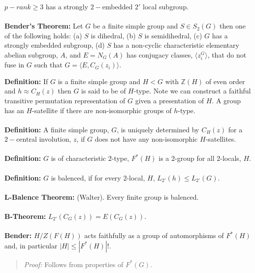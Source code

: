 $p-rank \ge 3$ has a strongly $2-$embedded $2'$ local subgroup.\\
\\
{\bf Bender's Theorem:} 
Let $G$ be a finite simple group and $S \in S_2(G)$ then one of the following holds:
(a) $S$ is dihedral, (b) $S$ is semidihedral, (c) $G$ has a strongly embedded subgroup,
(d) $S$ has a non-cyclic characteristic elementary abelian subgroup, $A$, and
$E=N_G(A)$ has conjugacy classes, $ \langle z_i^G \rangle $, that do not fuse in $G$ such that
$G= \langle E, C_G(z_i ) \rangle $.
\begin{quote}
\end{quote}
{\bf Definition:}
If $G$ is a finite simple group and
$H<G$ with ${\mathbb Z}(H)$ of even order and $h \approx C_H(z)$ then $G$ is said
to be of $H$-type.  Note we can construct a faithful transitive permutation representation
of $G$ given a presentation of $H$.  A group has an $H$-satellite if there are non-isomorphic
groups of $h$-type.
\\
\\
{\bf Definition:}
A finite simple group, $G$, is uniquely determined by $C_H(z)$ for a $2-$central
involution, $z$, if $G$ does not have any non-isomorphic $H$-satellites.
\\
\\
{\bf Definition:} $G$ is of characteristic $2$-type, $F^*(H)$ is a $2$-group for all $2$-locals,
$H$.
\\
\\
{\bf Definition:} $G$ is balenced, if for every $2$-local, $H$, $L_{2'}(h) \leq  L_{2'}(G)$.
\\
\\
{\bf L-Balence Theorem:} (Walter). Every finite group is balenced.
\\
\\
{\bf B-Theorem:} $L_{2'}(C_G(z)) = E(C_G(z))$.
\\
\\
{\bf Bender:} $H/Z(F(H))$ acts faithfully as a group of automorphisms of $F^*(H)$ and, 
in particular $|H| \leq |F^*(H)|!$.

\begin{quote}
\emph{Proof:} Follows from properties of $F^*(G)$.
\end{quote}

